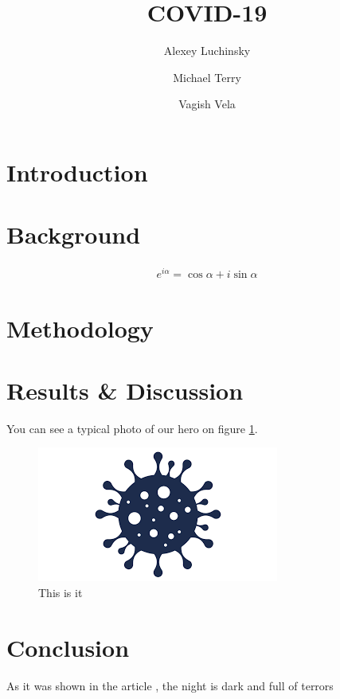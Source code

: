 \documentclass[conference]{IEEEtran}
\begin{document}
\title{COVID-19}
\author{Alexey Luchinsky \and Michael Terry  \and Vagish Vela}
\maketitle

\begin{abstract}
  \blindtext
\end{abstract}

\section{Introduction}

\blindtext

\blindtext

\section{Background}

\blindtext 

\begin{eqnarray}
  \label{eq:1}
  e^{i\alpha} = \cos\alpha + i \sin\alpha
\end{eqnarray}

\blindtext 

\blindtext 

\section{Methodology}

\blindtext


\blindenumerate[10]

\section{ Results \& Discussion }

You can see a typical photo of our hero on figure \ref{fig}.

\begin{figure}[htbp]
\centerline{\includegraphics{covid19.png}}
\caption{This is it}
\label{fig}
\end{figure}


\section{Conclusion}

As it was shown in the article \cite{IEEEexample:article_typical}, the night is dark and full of terrors




\end{document}
